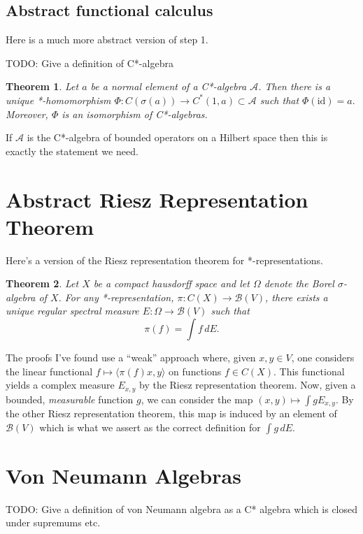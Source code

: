 \documentclass[a4paper,11pt,twoside]{amsart}
\newtheorem*{theorem}{Theorem}
\theoremstyle{definition}
\begin{document}
\subsection{Abstract functional calculus}
Here is a much more abstract version of step 1.

TODO: Give a definition of C*-algebra

\begin{theorem}
Let $a$ be a normal element of a C*-algebra $\mathcal{A}$. Then there is a unique *-homomorphism $\Phi \colon C(\sigma(a)) \to C^*(1,a) \subset \mathcal{A}$ such that $\Phi(\mathrm{id}) = a.$ Moreover, $\Phi$ is an isomorphism of C*-algebras.
\end{theorem}

If $\mathcal{A}$ is the C*-algebra of bounded operators on a Hilbert space then this is exactly the statement we need.

\section{Abstract Riesz Representation Theorem}
Here's a version of the Riesz representation theorem for *-representations.
\begin{theorem}
    Let $X$ be a compact hausdorff space and let $\Omega$ denote the Borel $\sigma$-algebra of $X$. For any *-representation, $\pi \colon C(X) \to \mathcal{B}(V)$, there exists a unique regular spectral measure $E \colon \Omega \to \mathcal{B}(V)$ such that
    \[
    \pi(f) = \int f \, dE.
    \]
\end{theorem}

The proofs I've found use a ``weak'' approach where, given $x,y \in V$, one considers the linear functional $f \mapsto \langle \pi(f)x,y\rangle$ on functions $f \in C(X)$. This functional yields a complex measure $E_{x,y}$ by the Riesz representation theorem. Now, given a bounded, \emph{measurable} function $g$, we can consider the map $(x,y) \mapsto \int g E_{x,y}$. By the other Riesz representation theorem, this map is induced by an element of $\mathcal{B}(V)$ which is what we assert as the correct definition for $\int g\,  dE.$

\section{Von Neumann Algebras}

TODO: Give a definition of von Neumann algebra as a C* algebra which is closed under supremums etc. \cite{MR861016}

\nocite{*}
\printbibliography
\end{document}
